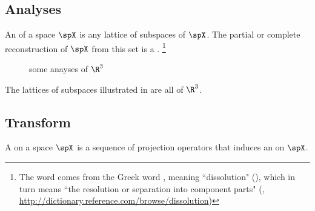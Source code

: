 \subsection{Analyses}
An  of a space $\spX$ is any lattice of subspaces of $\spX$.
        The partial or complete reconstruction of $\spX$ from this set is a .%
\footnote{%
  The word  comes from the Greek word
  {},
  meaning ``dissolution" (),
  which in turn means
  ``the resolution or separation into component parts"
  (, \scs\url{http://dictionary.reference.com/browse/dissolution})
  }

\begin{figure}[th]
  \caption{some anayses of $\R^3$  \label{fig:r3analyses}}
\end{figure}%
\begin{example}
\label{ex:r3analyses}
  The lattices of subspaces illustrated in  are all  of 
  $\R^3$.
\end{example}



\subsection{Transform}
\begin{definition}
A  on a space $\spX$ is a sequence of projection operators that induces 
an  on $\spX$.
\end{definition}

